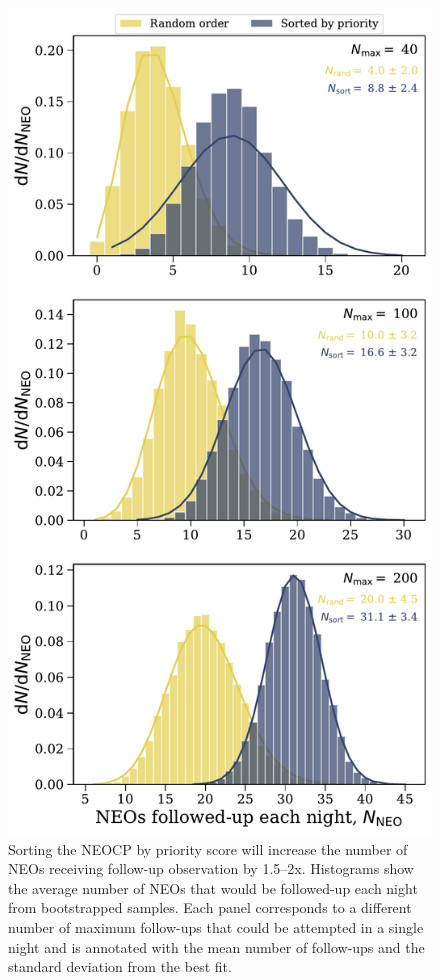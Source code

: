 \documentclass[twocolumn]{aastex631}
\begin{document}
\begin{figure}[htb]
    \centering
    \includegraphics[width=\columnwidth]{sorting_benefits.pdf}
    \caption{Sorting the NEOCP by priority score will increase the number of NEOs receiving follow-up observation by 1.5--2x. Histograms show the average number of NEOs that would be followed-up each night from bootstrapped samples. Each panel corresponds to a different number of maximum follow-ups that could be attempted in a single night and is annotated with the mean number of follow-ups and the standard deviation from the best fit.}
    \label{fig:sort_by_score}
\end{figure}
\end{document}
